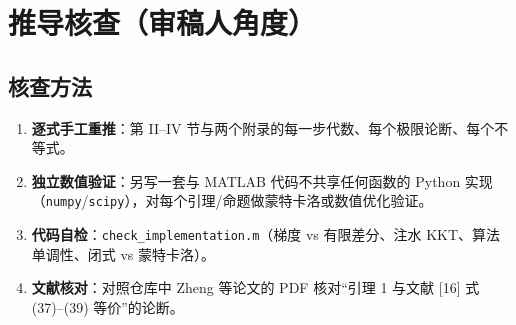 \documentclass[11pt,a4paper]{ctexart}
\newcommand{\code}[1]{\texttt{#1}}
\begin{document}
\section{推导核查（审稿人角度）}
\subsection{核查方法}
\begin{enumerate}
\item \textbf{逐式手工重推}：第 II--IV 节与两个附录的每一步代数、每个极限论断、每个不等式。
\item \textbf{独立数值验证}：另写一套与 MATLAB 代码不共享任何函数的 Python 实现（\code{numpy}/\code{scipy}），对每个引理/命题做蒙特卡洛或数值优化验证。
\item \textbf{代码自检}：\code{check\_implementation.m}（梯度 vs 有限差分、注水 KKT、算法单调性、闭式 vs 蒙特卡洛）。
\item \textbf{文献核对}：对照仓库中 Zheng 等论文的 PDF 核对“引理 1 与文献 [16] 式 (37)--(39) 等价”的论断。
\end{enumerate}
\end{document}
